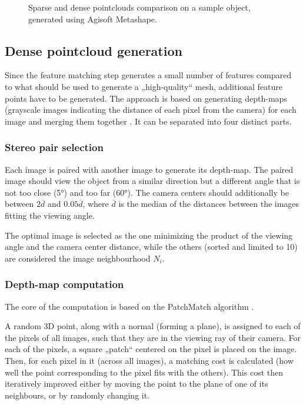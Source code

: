 \begin{figure}[h]
	\centering
	\hfill
	\caption{Sparse and dense pointclouds comparison on a sample object, generated using Agisoft Metashape.}%
\end{figure}

\subsection{Dense pointcloud generation}
Since the feature matching step generates a small number of features compared to what should be used to generate a „high-quality“ mesh, additional feature points have to be generated.
The approach is based on generating depth-maps (grayscale images indicating the distance of each pixel from the camera) for each image and merging them together \cite{shen2013accurate}.
It can be separated into four distinct parts.

\subsubsection{Stereo pair selection}
Each image is paired with another image to generate its depth-map.
The paired image should view the object from a similar direction but a different angle that is not too close (\ang{5}) and too far (\ang{60}).
The camera centers should additionally be between $2 \overline{d}$ and $0.05 \overline{d}$, where $\overline{d}$ is the median of the distances between the images fitting the viewing angle.

The optimal image is selected as the one minimizing the product of the viewing angle and the camera center distance, while the others (sorted and limited to 10) are considered the image neighbourhood $N_i$.

\subsubsection{Depth-map computation}
The core of the computation is based on the PatchMatch algorithm \cite{barnes2009PAR}.

A random 3D point, along with a normal (forming a plane), is assigned to each of the pixels of all images, such that they are in the viewing ray of their camera.
For each of the pixels, a square „patch“ centered on the pixel is placed on the image.
Then, for each pixel in it (across all images), a matching cost is calculated (how well the point corresponding to the pixel fits with the others).
This cost then iteratively improved either by moving the point to the plane of one of its neighbours, or by randomly changing it.

